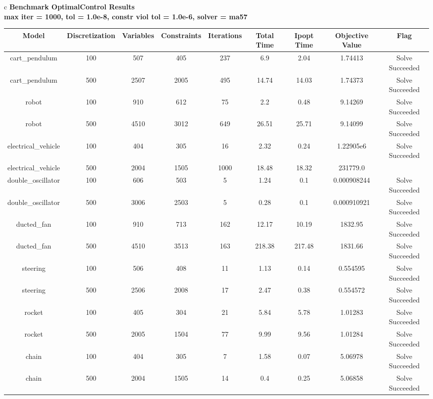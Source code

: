 \documentclass{standalone}
\begin{document}
\begin{tabular}{c}
\Large\textbf{Benchmark OptimalControl Results}\\
\large\textbf{max iter = 1000, tol = 1.0e-8, constr viol tol = 1.0e-6, solver = ma57}\\
\begin{tabular}{ccccccccc}
  \hline
  \textbf{Model} & \textbf{Discretization} & \textbf{Variables} & \textbf{Constraints} & \textbf{Iterations} & \textbf{Total Time} & \textbf{Ipopt Time} & \textbf{Objective Value} & \textbf{Flag} \\\hline
  cart\_pendulum & 100 & 507 & 405 & 237 & 6.9 & 2.04 & 1.74413 & Solve Succeeded \\
  cart\_pendulum & 500 & 2507 & 2005 & 495 & 14.74 & 14.03 & 1.74373 & Solve Succeeded \\
  robot & 100 & 910 & 612 & 75 & 2.2 & 0.48 & 9.14269 & Solve Succeeded \\
  robot & 500 & 4510 & 3012 & 649 & 26.51 & 25.71 & 9.14099 & Solve Succeeded \\
  electrical\_vehicle & 100 & 404 & 305 & 16 & 2.32 & 0.24 & 1.22905e6 & Solve Succeeded \\
  electrical\_vehicle & 500 & 2004 & 1505 & 1000 & 18.48 & 18.32 & 231779.0 & \color{red}{Iterations Exceeded} \\
  double\_oscillator & 100 & 606 & 503 & 5 & 1.24 & 0.1 & 0.000908244 & Solve Succeeded \\
  double\_oscillator & 500 & 3006 & 2503 & 5 & 0.28 & 0.1 & 0.000910921 & Solve Succeeded \\
  ducted\_fan & 100 & 910 & 713 & 162 & 12.17 & 10.19 & 1832.95 & Solve Succeeded \\
  ducted\_fan & 500 & 4510 & 3513 & 163 & 218.38 & 217.48 & 1831.66 & Solve Succeeded \\
  steering & 100 & 506 & 408 & 11 & 1.13 & 0.14 & 0.554595 & Solve Succeeded \\
  steering & 500 & 2506 & 2008 & 17 & 2.47 & 0.38 & 0.554572 & Solve Succeeded \\
  rocket & 100 & 405 & 304 & 21 & 5.84 & 5.78 & 1.01283 & Solve Succeeded \\
  rocket & 500 & 2005 & 1504 & 77 & 9.99 & 9.56 & 1.01284 & Solve Succeeded \\
  chain & 100 & 404 & 305 & 7 & 1.58 & 0.07 & 5.06978 & Solve Succeeded \\
  chain & 500 & 2004 & 1505 & 14 & 0.4 & 0.25 & 5.06858 & Solve Succeeded \\

\end{tabular}
\end{tabular}
\end{document}
